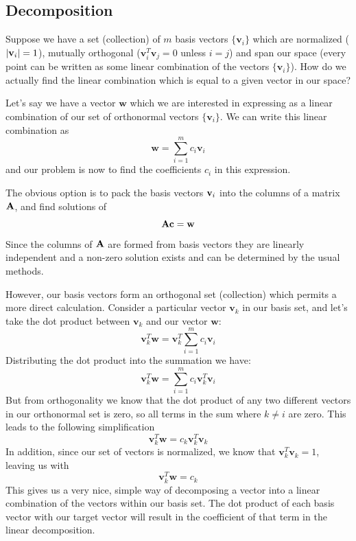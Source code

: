 \subsection{Decomposition}

Suppose we have a set (collection) of $m$ basis vectors $\{ {\mathbf v}_i \}$ which are normalized ($ |\mathbf{v}_i| = 1$), mutually orthogonal (${\mathbf v}_i ^T {\mathbf v}_j = 0$ unless $i=j$) and span our space (every point can be written as some linear combination of the vectors $\{ {\mathbf v}_i \}$).  How do we actually find the linear combination which is equal to a given vector in our space?

Let's say we have a vector ${\mathbf w}$ which we are interested in expressing as a linear combination of our set of orthonormal vectors $\{ {\mathbf v}_i \}$.  We can write this linear combination as
\begin{equation}
{\mathbf w} = \sum_{i=1}^m c_i {\mathbf v}_i
\end{equation}
and our problem is now to find the coefficients $c_i$ in this expression.

The obvious option is to pack the basis vectors $\mathbf{v}_i$ into the columns of a matrix $\mathbf{A}$, and find solutions of
\[ \mathbf{A} \mathbf{c} = \mathbf{w} \]
Since the columns of $\mathbf{A}$ are formed from basis vectors they are linearly independent and a non-zero solution exists and can be determined by the usual methods.

However, our basis vectors form an orthogonal set (collection) which permits a more direct calculation. Consider  a particular vector ${\mathbf v}_k$ in our basis set, and let's take the dot product between $\mathbf{v}_k$ and our vector $\mathbf{w}$:
\begin{equation}
{\mathbf v}_k^T {\mathbf w} = {\mathbf v}_k ^T\sum_{i=1}^m c_i {\mathbf v}_i
\end{equation}
Distributing the dot product into the summation we have:
\begin{equation}
{\mathbf v}_k^T {\mathbf w} = \sum_{i=1}^m c_i {\mathbf v}_k^T{\mathbf v}_i
\end{equation}
But from orthogonality we know that the dot product of any two different vectors in our orthonormal set is zero, so all terms in the sum where $k \neq i$ are zero. This leads to the following simplification
\begin{equation}
{\mathbf v}_k^T {\mathbf w} = c_k {\mathbf v}_k^T {\mathbf v}_k
\end{equation}
In addition, since our set of vectors is normalized, we know that ${\mathbf v}_k^T {\mathbf v}_k = 1$, leaving us with
\begin{equation}
{\mathbf v}_k^T {\mathbf w} = c_k
\end{equation}
This gives us a very nice, simple way of decomposing a vector into a linear combination of the vectors within our basis set.  The dot product of each basis vector with our target vector will result in the coefficient of that term in the linear decomposition.

